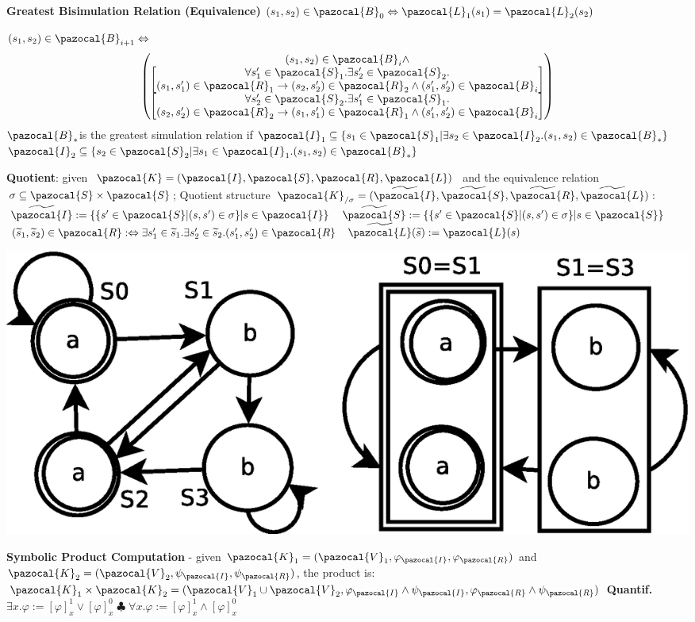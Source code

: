 \documentclass{article}
\newcommand{\Kb}{\pazocal{K}}
\newcommand{\Ib}{\pazocal{I}}
\newcommand{\Sb}{\pazocal{S}}
\newcommand{\Rb}{\pazocal{R}}
\newcommand{\Lb}{\pazocal{L}}
\newcommand{\Bb}{\pazocal{B}}
\newcommand{\Vb}{\pazocal{V}}
\begin{document}
\begin{multicols}{4}
\textbf{Greatest Bisimulation Relation (Equivalence)}
${(s_1,s_2) \in \Bb_{0}\Leftrightarrow \Lb_1(s_1)=\Lb_2(s_2)}$

${(s_1,s_2) \in \Bb_{i+1}\Leftrightarrow}$
\begin{align*}
  \begin{pmatrix}
    (s_1,s_2) \in \Bb_{i} \wedge\\
    \begin{bmatrix}
    		\forall s'_1 \in \Sb_1.\exists s'_2 \in \Sb_2.\\
   		(s_1,s'_1) \in \Rb_1 \rightarrow (s_2,s'_2) \in \Rb_2 \wedge (s'_1,s'_2) \in \Bb_{i}
    \end{bmatrix}\\
    \begin{bmatrix}
    		\forall s'_2 \in \Sb_2.\exists s'_1 \in \Sb_1.\\
   		(s_2,s'_2) \in \Rb_2 \rightarrow (s_1,s'_1) \in \Rb_1 \wedge (s'_1,s'_2) \in \Bb_{i}
    \end{bmatrix}
  \end{pmatrix}
\end{align*}
$\Bb_*$is the greatest simulation relation if ${\Ib_1 \subseteq \{s_1 \in \Sb_1 | \exists s_2 \in \Ib_2 . (s_1, s_2) \in \Bb_* \}}$ ${\Ib_2 \subseteq \{s_2 \in \Sb_2 | \exists s_1 \in \Ib_1 . (s_1, s_2) \in \Bb_* \}}$

\textbf{Quotient}: given ${\Kb=(\Ib,\Sb,\Rb,\Lb)}$ and the equivalence relation $\sigma \subseteq \Sb \times \Sb$; Quotient structure $\Kb_{/\sigma}=(\widetilde{\Ib},\widetilde{\Sb},\widetilde{\Rb},\widetilde{\Lb})$:
$\widetilde{\Ib}:=\{\{s' \in \Sb | (s,s') \in \sigma \} | s \in \Ib \}$
$\widetilde{\Sb}:=\{\{s' \in \Sb | (s,s') \in \sigma \} | s \in \Sb \}$
$(\widetilde{s}_1,\widetilde{s}_2) \in \Rb :\Leftrightarrow \exists s'_1 \in \widetilde{s}_1. \exists s'_2 \in \widetilde{s}_2.(s'_1,s'_2) \in \Rb$
$\widetilde{\Lb}( \widetilde{s} ):= \Lb(s)$


\includegraphics[width=0.7\columnwidth]{Quotient}


\textbf{Symbolic Product Computation} - given ${\Kb_1=(\Vb_1,\varphi_{\Ib},\varphi_{\Rb})}$ and ${\Kb_2=(\Vb_2,\psi_{\Ib},\psi_{\Rb})}$, the product is: $\Kb_1 \times \Kb_2 = (\Vb_1 \cup \Vb_2, \varphi_{\Ib} \wedge \psi_{\Ib},\varphi_{\Rb} \wedge \psi_{\Rb} )$
\textbf{Quantif.} ${\exists x.\varphi:=[\varphi]^{1}_{x} \vee [\varphi]^{0}_{x}}\; \clubsuit\; {\forall x.\varphi:=[\varphi]^{1}_{x} \wedge [\varphi]^{0}_{x}}$


\end{multicols}
\end{document}
